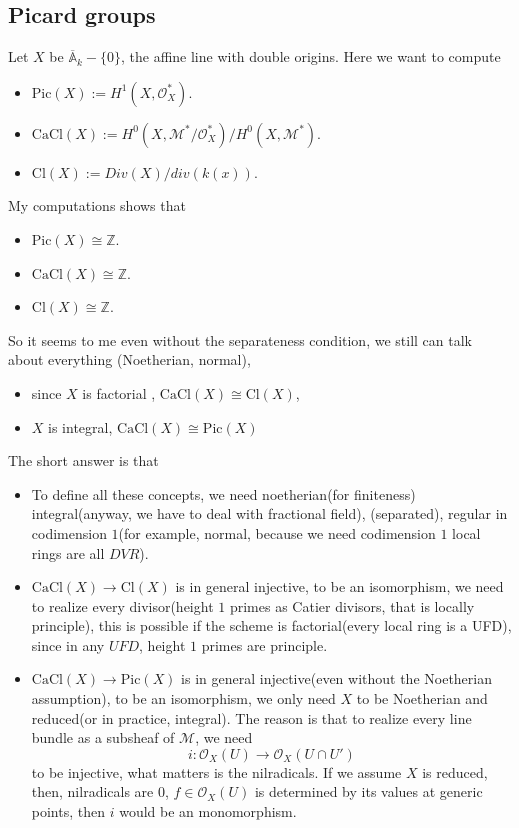 \documentclass[../main.tex]{subfiles}
\begin{document}
\subsection{Picard groups}
\begin{example}
Let $X$ be $\overline{\mathbb{A}}_{k}-\{0\}$, the affine line with double origins. Here we want to compute 
\begin{itemize}
\item $\mathrm{Pic}(X):=H^{1}(X,\mathcal{O}_{X}^{*})$.
\item $\mathrm{CaCl}(X):=H^{0}(X, \mathcal{M}^{*}/\mathcal{O}_{X}^{*})/H^{0}(X,\mathcal{M}^{*})$.
\item $\mathrm{Cl}(X):=Div(X)/div(k(x))$.
\end{itemize}
My computations shows that 
\begin{itemize}
\item $\mathrm{Pic}(X)\cong \mathbb{Z}$.
\item $\mathrm{CaCl}(X)\cong \mathbb{Z}$.
\item $\mathrm{Cl}(X)\cong \mathbb{Z}$.
\end{itemize}
So it seems to me even without the separateness condition, we still can talk about everything (Noetherian, normal), 
\begin{itemize}
\item since $X$ is factorial , $\mathrm{CaCl}(X)\cong \mathrm{Cl}(X)$,
\item $X$ is integral, $\mathrm{CaCl}(X)\cong \mathrm{Pic}(X)$
\end{itemize}
\end{example}
\begin{remark}
The short answer is that 
\begin{itemize}
\item To define all these concepts, we need noetherian(for finiteness) integral(anyway, we have to deal with fractional field), (separated), regular in codimension $1$(for example, normal, because we need codimension $1$ local rings are all $DVR$).
\item $\mathrm{CaCl}(X)\rightarrow \mathrm{Cl}(X)$ is in general injective, to be an isomorphism, we need to realize every divisor(height $1$ primes as Catier divisors, that is locally principle), this is possible if the scheme is factorial(every local ring is a UFD), since in any $UFD$, height $1$ primes are principle. 
\item $\mathrm{CaCl}(X)\rightarrow \mathrm{Pic}(X)$ is in general injective(even without the Noetherian assumption), to be an isomorphism, we only need $X$ to be Noetherian and reduced(or in practice, integral). The reason is that to realize every line bundle as a subsheaf of $\mathcal{M}$, we need 
$$i:\mathcal{O}_{X}(U)\rightarrow \mathcal{O}_{X}(U\cap U')$$
to be injective, what matters is the nilradicals. If we assume $X$ is reduced, then, nilradicals are $0$, $f\in \mathcal{O}_{X}(U)$ is determined by its values at generic points, then $i$ would be an monomorphism.
\end{itemize}
\end{remark}
\end{document}
